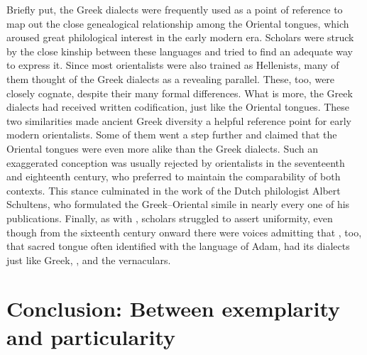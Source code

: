 Briefly put, the Greek dialects were frequently used as a point of reference to map out the close genealogical relationship among the Oriental tongues, which aroused great philological interest in the early modern era. Scholars were struck by the close kinship between these languages and tried to find an adequate way to express it. Since most orientalists were also trained as Hellenists, many of them thought of the Greek dialects as a revealing parallel. These, too, were closely cognate, despite their many formal differences. What is more, the Greek dialects had received written codification, just like the Oriental tongues. These two similarities made ancient Greek diversity a helpful reference point for early modern orientalists. Some of them went a step further and claimed that the Oriental tongues were even more alike than the Greek dialects. Such an exaggerated conception was usually rejected by orientalists in the seventeenth and eighteenth century, who preferred to maintain the comparability of both contexts. This stance culminated in the work of the Dutch philologist Albert Schultens, who formulated the Greek–Oriental simile in nearly every one of his publications. Finally, as with , scholars struggled to assert  uniformity, even though from the sixteenth century onward there were voices admitting that , too, that sacred tongue often identified with the language of Adam, had its dialects just like Greek, , and the vernaculars.

\section{Conclusion: Between exemplarity and particularity}\label{sec:8.4}

